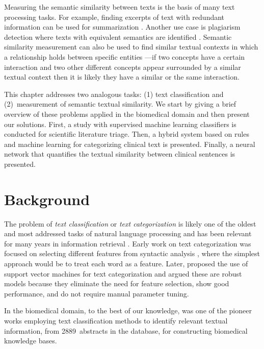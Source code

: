 Measuring the semantic similarity between texts is the basis of many text processing tasks.
For example, finding excerpts of text with redundant information can be used for summarization \parencite{aliguliyev2009a}.
Another use case is plagiarism detection where texts with equivalent semantics are identified \parencite{lukashenko2007a}.
Semantic similarity measurement can also be used to find similar textual contexts in which a relationship holds between specific entities \parencite{panchenko2012a}---if two concepts have a certain interaction and two other different concepts appear surrounded by a similar textual context then it is likely they have a similar or the same interaction.

This chapter addresses two analogous  tasks: (1) text classification and (2)~measurement of semantic textual similarity.
We start by giving a brief overview of these problems applied in the biomedical domain and then present our solutions.
First, a study with supervised machine learning classifiers is conducted for scientific literature triage.
Then, a hybrid system based on rules and machine learning for categorizing clinical text is presented.
Finally, a neural network that quantifies the textual similarity between clinical sentences is presented.


\section{Background}

The problem of \textit{text classification} or \textit{text categorization} is likely one of the oldest and most addressed tasks of natural language processing and has been relevant for many years in information retrieval \parencite{lewis1995a,manning2008a}.
Early work on text categorization was focused on selecting different features from syntactic analysis \parencite{lewis1992a}, where the simplest approach would be to treat each word as a feature.
Later, \textcite{joachims1998a} proposed the use of support vector machines for text categorization and argued these are robust models because they eliminate the need for feature selection, show good performance, and do not require manual parameter tuning.

In the biomedical domain, to the best of our knowledge, \textcite{craven1999a} was one of the pioneer works employing text classification methods to identify relevant textual information, from 2889~abstracts in the  database, for constructing biomedical knowledge bases.

